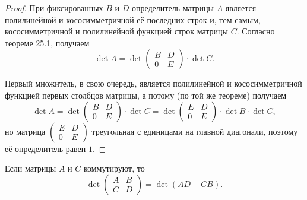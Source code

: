 \begin{proof}
    При фиксированных $B$ и $D$ определитель матрицы $A$ является полилинейной и кососимметричной её последних строк и, тем самым, кососимметричной и полилинейной функцией строк матрицы $C$. Согласно теореме 25.1, получаем
    $$
    \det A = \det
    \begin{pmatrix}
        B & D\\
        0 & E
    \end{pmatrix} \cdot \det C.
    $$

    Первый множитель, в свою очередь, является полилинейной и кососимметричной функцией первых столбцов матрицы, а потому (по той же теореме) получаем
    $$
    \det A = \det
    \begin{pmatrix}
        B & D\\
        0 & E
    \end{pmatrix} \cdot \det C = 
    \det 
    \begin{pmatrix}
        E & D\\
        0 & E
    \end{pmatrix} \cdot \det B \cdot \det C,
    $$
    но матрица $
    \begin{pmatrix}
        E & D\\
        0 & E
    \end{pmatrix}
    $ треугольная с единицами на главной диагонали, поэтому её определитель равен $1$.
\end{proof}

\begin{statement}
    Если матрицы $A$ и $C$ коммутируют, то
    $$
    \det
    \begin{pmatrix}
        A & B\\
        C & D
    \end{pmatrix} = 
    \det(AD - CB).
    $$
\end{statement}


